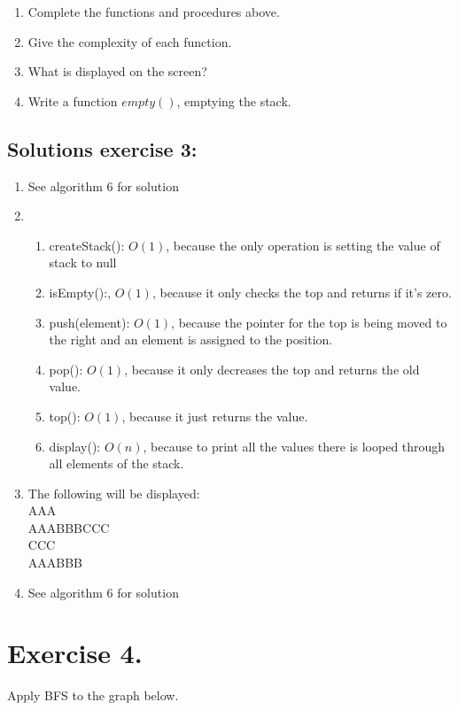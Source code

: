 \documentclass{article}
\begin{document}
\begin{enumerate}
\item Complete the functions and procedures above.
\item Give the complexity of each function.
\item What is displayed on the screen?
\item Write a function $empty()$, emptying the stack.
\end{enumerate}

\newpage

\subsection*{Solutions exercise 3:}
\begin{enumerate}
    \item See algorithm 6 for solution
    \item
        \begin{enumerate}[label=(\alph*)]
            \item createStack(): $O(1)$, because the only operation is setting the value of stack to null
            \item isEmpty():, $O(1)$, because it only checks the top and returns if it's zero.
            \item push(element): $O(1)$, because the pointer for the top is being moved to the right and an element is assigned to the position.
            \item pop(): $O(1)$, because it only decreases the top and returns the old value.
            \item top(): $O(1)$, because it just returns the value.
            \item display(): $O(n)$, because to print all the values there is looped through all elements of the stack.
        \end{enumerate}
    \item The following will be displayed: \\
        AAA \\
        AAABBBCCC \\
        CCC \\
        AAABBB
    \item See algorithm 6 for solution
\end{enumerate}

\section*{Exercise 4.}
Apply BFS to the graph below.
\end{document}
